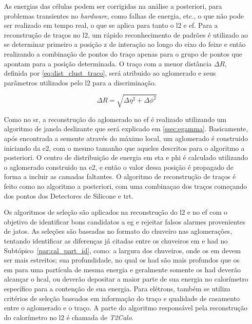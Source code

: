 As energias das células podem ser corrigidas na análise a posteriori, para
problemas transientes no \emph{hardware}, como falhas de energia, etc., o que não
pode ser realizado em tempo real, o que se aplica para tanto o \gls{l2} e
\gls{ef}. Para a reconstrução de traços no \gls{l2}, um rápido reconhecimento de
padrões é utilizado ao se determinar primeiro a posição z de interação ao longo
do eixo do feixe e então realizando a combinação de pontos do traço apenas para o grupo
de pontos que apontam para a posição determinada. O traço com a menor distância
$\Delta R$, definida por \ref{eq:dist_clust_traco}, será atribuido ao
aglomerado e seus parâmetros utilizados pelo \gls{l2} para a discriminação.

\begin{equation}\label{eq:dist_clust_traco}
\Delta R = \sqrt{\Delta\eta^2+\Delta\phi^2}
\end{equation}

Como no \gls{sr}, a reconstrução do aglomerado no \gls{ef} é realizado
utilizando um algoritmo de janela deslizante que será
explicado em \ref{ssec:egamma}. Basicamente, após encontrada
a semente através do máximo local, um aglomerado é construido iniciando da \gls{e2},
com o mesmo tamanho que aqueles descritos para o algoritmo a posteriori. O
centro de distribuição de energia em \gls{eta} e \gls{phi} é calculado
utilizando o aglomerado construido na \gls{e2}, e então o valor dessa
posição é propagado de forma a incluir as camadas faltantes. O algoritmo
de reconstrução de traços é feito como no algoritmo a posteriori, com uma
combinaçao dos traços começando dos pontos dos Detectores de Silicone e
\gls{trt}.

Os algoritmos de seleção são aplicados na reconstrução do
\gls{l2} e no \gls{ef} com o objetivo de identificar bons candidatos a \gls{eg}
e rejeitar falsos alarmes provenientes de jatos. As seleções são baseadas no
formato do chuveiro nas aglomerações, tentando identificar as diferenças já
citadas entre os chuveiros \gls{em} e \gls{had} no
Subtópico~\ref{par:cal_part_id}, como: a largura dos chuveiros, onde os \gls{em}
devem ser mais estreitos; sua profundidade, no qual os \gls{had} são mais
profundos que os \gls{em} para uma partícula de mesma energia e geralmente
somente os \gls{had} deverão alcançar o \gls{hcal}, ou deverão
depositar a maior parte de sua energia no calorímetro específico para a
contenção de sua energia. Para elétrons, também se utiliza critérios de seleção 
baseados em informação do traço e qualidade de casamento entre o aglomerado e o
traço. A parte do algoritmo responsável pela reconstrução do calorímetro no
\gls{l2} é chamada de \emph{T2Calo}.


